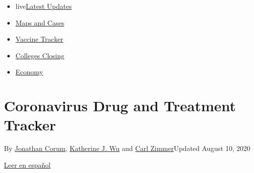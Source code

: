 \begin{itemize}
\tightlist
\item
  live\href{https://www.nytimes3xbfgragh.onion/2020/08/21/world/covid-19-coronavirus.html?name=styln-coronavirus-national\&region=TOP_BANNER\&variant=undefined\&block=storyline_menu_recirc\&action=click\&pgtype=Interactive\&impression_id=15f07e61-e39b-11ea-89f5-73e141fcc61b}{Latest
  Updates}
\item
  \href{https://www.nytimes3xbfgragh.onion/interactive/2020/us/coronavirus-us-cases.html?name=styln-coronavirus-national\&region=TOP_BANNER\&variant=undefined\&block=storyline_menu_recirc\&action=click\&pgtype=Interactive\&impression_id=15f07e62-e39b-11ea-89f5-73e141fcc61b}{Maps
  and Cases}
\item
  \href{https://www.nytimes3xbfgragh.onion/interactive/2020/science/coronavirus-vaccine-tracker.html?name=styln-coronavirus-national\&region=TOP_BANNER\&variant=undefined\&block=storyline_menu_recirc\&action=click\&pgtype=Interactive\&impression_id=15f07e63-e39b-11ea-89f5-73e141fcc61b}{Vaccine
  Tracker}
\item
  \href{https://www.nytimes3xbfgragh.onion/2020/08/19/us/colleges-closing-covid.html?name=styln-coronavirus-national\&region=TOP_BANNER\&variant=undefined\&block=storyline_menu_recirc\&action=click\&pgtype=Interactive\&impression_id=15f0a570-e39b-11ea-89f5-73e141fcc61b}{Colleges
  Closing}
\item
  \href{https://www.nytimes3xbfgragh.onion/live/2020/08/20/business/stock-market-today-coronavirus?name=styln-coronavirus-national\&region=TOP_BANNER\&variant=undefined\&block=storyline_menu_recirc\&action=click\&pgtype=Interactive\&impression_id=15f0a571-e39b-11ea-89f5-73e141fcc61b}{Economy}
\end{itemize}

\hypertarget{coronavirus-drug-and-treatment-tracker}{%
\section{Coronavirus Drug and Treatment
Tracker}\label{coronavirus-drug-and-treatment-tracker}}

By \href{https://www.nytimes3xbfgragh.onion/by/jonathan-corum}{Jonathan
Corum},
\href{https://www.nytimes3xbfgragh.onion/by/katherine-j--wu}{Katherine
J. Wu} and \href{https://www.nytimes3xbfgragh.onion/by/carl-zimmer}{Carl
Zimmer}Updated August 10, 2020

\href{https://www.nytimes3xbfgragh.onion/es/interactive/2020/science/coronavirus-tratamientos-curas.html}{Leer
en español}


